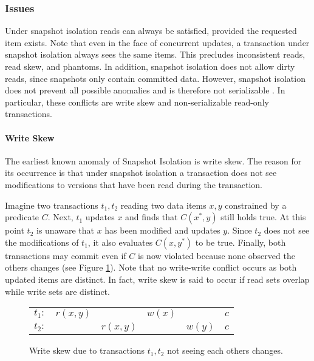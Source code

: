 \subsubsection{Issues}

Under snapshot isolation reads can always be satisfied, provided the requested
item exists. Note that even in the face of concurrent updates, a transaction
under snapshot isolation always sees the same items. This precludes inconsistent
reads, read skew, and phantoms. In addition, snapshot isolation does not allow
dirty reads, since snapshots only contain committed data. However, snapshot
isolation does not prevent all possible anomalies and is therefore not
serializable \cite{berenson1995critique, fekete2004read}. In particular, these
conflicts are write skew and non-serializable read-only transactions.

\paragraph{Write Skew}

The earliest known anomaly of Snapshot Isolation is write skew. The reason for
its occurrence is that under snapshot isolation a transaction does not see
modifications to versions that have been read during the transaction.

Imagine two transactions $t_1, t_2$ reading two data items $x, y$ constrained by
a predicate $C$. Next, $t_1$ updates $x$ and finds that $C(x^{*}, y)$ still
holds true. At this point $t_2$ is unaware that $x$ has been modified and
updates $y$. Since $t_2$ does not see the modifications of $t_1$, it also
evaluates $C(x, y^{*})$ to be true. Finally, both transactions may commit even
if $C$ is now violated because none observed the others changes (see Figure
\ref{fig:write_skew}). Note that no write-write conflict occurs as both updated
items are distinct. In fact, write skew is said to occur if read sets overlap
while write sets are distinct.

\begin{figure}[!h]
    \centering
    \begin{tabular}{r c c c c c}
        $t_1:$ & $r(x,y)$ &          & $w(x)$ &        & $c$ \\
        $t_2:$ &          & $r(x,y)$ &        & $w(y)$ & $c$ \\
    \end{tabular}
    \caption{Write skew due to transactions $t_1, t_2$ not seeing each others changes.}
    \label{fig:write_skew}
\end{figure}

